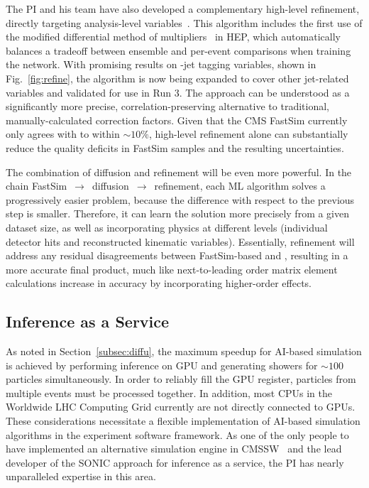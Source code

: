 The PI and his team have also developed a complementary high-level refinement, directly targeting analysis-level variables~\cite{Bein:2023ylt}.
This algorithm includes the first use of the modified differential method of multipliers~\cite{Platt:1987} in HEP,
which automatically balances a tradeoff between ensemble and per-event comparisons when training the network.
With promising results on \cPqb-jet tagging variables, shown in Fig.~\ref{fig:refine},
the algorithm is now being expanded to cover other jet-related variables and validated for use in Run 3.
The approach can be understood as a significantly more precise, correlation-preserving alternative to traditional, manually-calculated correction factors.
Given that the CMS FastSim currently only agrees with \GEANTfour to within ${\sim}10\%$,
high-level refinement alone can substantially reduce the quality deficits in FastSim samples and the resulting uncertainties.

The combination of diffusion and refinement will be even more powerful.
In the chain FastSim~$\to$~diffusion~$\to$~refinement, each ML algorithm solves a progressively easier problem,
because the difference with respect to the previous step is smaller.
Therefore, it can learn the solution more precisely from a given dataset size,
as well as incorporating physics at different levels (individual detector hits and reconstructed kinematic variables).
Essentially, refinement will address any residual disagreements between FastSim-based \diffu and \GEANTfour,
resulting in a more accurate final product, much like next-to-leading order matrix element calculations increase in accuracy by incorporating higher-order effects.

\subsection{Inference as a Service}\label{subsec:iaas}

As noted in Section~\ref{subsec:diffu}, the maximum speedup for AI-based simulation is achieved by performing inference on GPU
and generating showers for ${\sim}100$ particles simultaneously.
In order to reliably fill the GPU register, particles from multiple events must be processed together.
In addition, most CPUs in the Worldwide LHC Computing Grid currently are not directly connected to GPUs.
These considerations necessitate a flexible implementation of AI-based simulation algorithms in the experiment software framework.
As one of the only people to have implemented an alternative simulation engine in CMSSW~\cite{Pedro:2020kbk}
and the lead developer of the SONIC approach for inference as a service,
the PI has nearly unparalleled expertise in this area.

